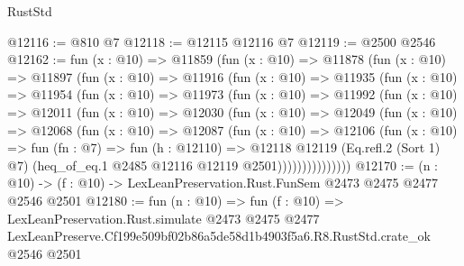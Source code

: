 \begin{lexlean}{RustStd}
\begin{coremodule}
@12116 := @810 @7
@12118 := @12115 @12116 @7
@12119 := @2500 @2546
@12162 := fun (x : @10) =>
  @11859
    (fun (x : @10) =>
    @11878
      (fun (x : @10) =>
      @11897
        (fun (x : @10) =>
        @11916
          (fun (x : @10) =>
          @11935
            (fun (x : @10) =>
            @11954
              (fun (x : @10) =>
              @11973
                (fun (x : @10) =>
                @11992
                  (fun (x : @10) =>
                  @12011
                    (fun (x : @10) =>
                    @12030
                      (fun (x : @10) =>
                      @12049
                        (fun (x : @10) =>
                        @12068
                          (fun (x : @10) =>
                          @12087
                            (fun (x : @10) =>
                            @12106
                              (fun (x : @10) =>
                              fun (fn : @7) =>
                              fun (h : @12110) =>
                              @12118
                                @12119
                                (Eq.refl.{2} (Sort 1) @7)
                                (heq_of_eq.{1} @2485 @12116 @12119 @2501)))))))))))))))
@12170 := (n : @10) -> (f : @10) -> LexLeanPreservation.Rust.FunSem @2473 @2475 @2477 @2546 @2501
@12180 := fun (n : @10) =>
  fun (f : @10) =>
  LexLeanPreservation.Rust.simulate
    @2473
    @2475
    @2477
    LexLeanPreserve.Cf199e509bf02b86a5de58d1b4903f5a6.R8.RustStd.crate_ok
    @2546
    @2501
\end{coremodule}
\end{lexlean}
